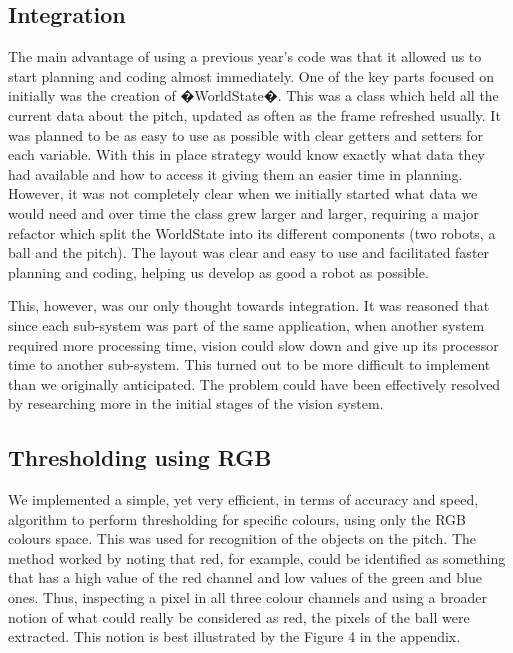 \subsection{Integration}

The main advantage of using a previous year's code was that it allowed us to start planning and coding almost immediately. One of the key parts focused on initially was the creation of �WorldState�. This was a class which held all the current data about the pitch, updated as often as the frame refreshed usually. It was planned to be as easy to use as possible with clear getters and setters for each variable. With this in place strategy would know exactly what data they had available and how to access it giving them an easier time in planning. However, it was not completely clear when we initially started what data we would need and over time the class grew larger and larger, requiring a major refactor which split the WorldState into its different components (two robots, a ball and the pitch). The layout was clear and easy to use and facilitated faster planning and coding, helping us develop as good a robot as possible.

This, however, was our only thought towards integration. It was reasoned that since each sub-system was part of the same application, when another system required more processing time, vision could slow down and give up its processor time to another sub-system. This turned out to be more difficult to implement than we originally anticipated. The problem could have been effectively resolved by researching more in the initial stages of the vision system.

\subsection{Thresholding using RGB}
\label{sec:thresh}

We implemented a simple, yet very efficient, in terms of accuracy and speed, algorithm to perform thresholding for specific colours, using only the RGB colours space. This was used for recognition of the objects on the pitch. The method worked by noting that red, for example, could be identified as something that has a high value of the red channel and low values of the green and blue ones. Thus, inspecting a pixel in all three colour channels and using a broader notion of what could really be considered as red, the pixels of the ball were extracted. This notion is best illustrated by the Figure 4 in the appendix.

